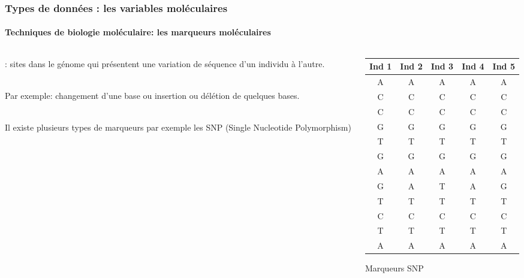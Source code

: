 \begin{frame}
\frametitle{Types de données : les variables moléculaires}
\framesubtitle{Techniques de biologie moléculaire: les marqueurs moléculaires}

\begin{columns}
\begin{column}{.5\textwidth}
 : sites dans le génome qui présentent une variation de séquence d’un individu à l’autre.  \\

~\\\vfill

Par exemple: changement d’une base ou insertion ou délétion de quelques bases. \\

~\\\vfill

Il existe plusieurs types de marqueurs par exemple les SNP (Single Nucleotide Polymorphism)
\end{column}

\begin{column}{.5\textwidth}

\small

\begin{tabular}{ccccc}
\hline
Ind 1 & Ind 2 & Ind 3 & Ind 4 & Ind 5 \\
\hline
A & A & A & A & A \\
C & C & C & C & C \\
C & C & C & C & C \\
G & G & G & G & G \\ 
T &T & T & T & T \\
G & G & G & G & G \\
A & A & A & A & A \\
\cellcolor{mln-green} G & \cellcolor{mln-green} A & \cellcolor{mln-green} T & \cellcolor{mln-green} A & \cellcolor{mln-green} G \\ 
T &T & T & T & T \\
C & C & C & C & C \\
T &T & T & T & T \\
A & A & A & A & A \\
\hline
\end{tabular}
\centering\small Marqueurs SNP
\end{column}

\end{columns}

\end{frame}



